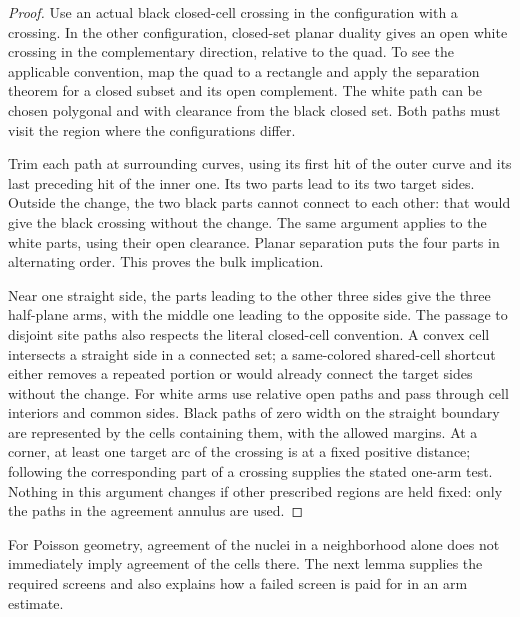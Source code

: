 \begin{proof}
Use an actual black closed-cell crossing in the configuration with a
crossing.  In the other configuration, closed-set planar duality gives
an open white crossing in the complementary direction, relative to
the quad.  To see the applicable convention, map the quad to a
rectangle and apply the separation theorem for a closed subset and
its open complement.  The white path can be chosen polygonal and
with clearance from the black closed set.  Both paths must visit the
region where the configurations differ.

Trim each path at surrounding curves, using its first hit of the
outer curve and its last preceding hit of the inner one.  Its two
parts lead to its two target sides.  Outside the change, the two
black parts cannot connect to each other: that would give the black
crossing without the change.  The same argument applies to the white
parts, using their open clearance.  Planar separation puts the four
parts in alternating order.  This proves the bulk implication.

Near one straight side, the parts leading to the other three sides
give the three half-plane arms, with the middle one leading to the
opposite side.  The passage to disjoint site paths also respects the
literal closed-cell convention.  A convex cell intersects a straight
side in a connected set; a same-colored shared-cell shortcut either
removes a repeated portion or would already connect the target sides
without the change.  For white arms use relative open paths and pass
through cell interiors and common sides.  Black paths of zero width
on the straight boundary are represented by the cells containing
them, with the allowed margins.  At a corner, at least one target
arc of the crossing is at a fixed positive distance; following the
corresponding part of a crossing supplies the stated one-arm test.
Nothing in this argument changes if other prescribed regions are
held fixed: only the paths in the agreement annulus are used.
\end{proof}

For Poisson geometry, agreement of the nuclei in a neighborhood alone
does not immediately imply agreement of the cells there.  The next
lemma supplies the required screens and also explains how a failed
screen is paid for in an arm estimate.


